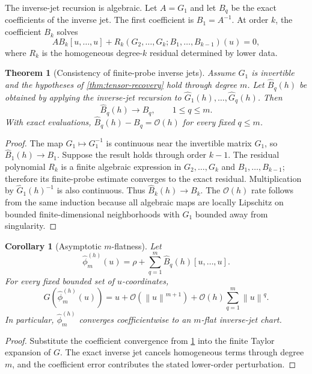\documentclass[11pt]{article}
\newtheorem{theorem}[definition]{Theorem}
\newtheorem{corollary}[definition]{Corollary}
\newcommand{\Oterm}{\mathcal O}
\newcommand{\norm}[1]{\left\lVert #1\right\rVert}
\begin{document}
The inverse-jet recursion is algebraic. Let \(A=G_1\) and let \(B_q\) be the exact coefficients of the inverse jet. The first coefficient is \(B_1=A^{-1}\). At order \(k\), the coefficient \(B_k\) solves
\[
        A B_k[u,\ldots,u]+R_k(G_2,\ldots,G_k;B_1,\ldots,B_{k-1})(u)=0,
\]
where \(R_k\) is the homogeneous degree-\(k\) residual determined by lower data.

\begin{theorem}[Consistency of finite-probe inverse jets]\label{thm:inverse-consistency}
Assume \(G_1\) is invertible and the hypotheses of \cref{thm:tensor-recovery} hold through degree \(m\). Let \(\widehat B_q(h)\) be obtained by applying the inverse-jet recursion to \(\widehat G_1(h),\ldots,\widehat G_q(h)\). Then
\[
        \widehat B_q(h)\to B_q,\qquad 1\le q\le m.
\]
With exact evaluations, \(\widehat B_q(h)-B_q=\Oterm(h)\) for every fixed \(q\le m\).
\end{theorem}

\begin{proof}
The map \(G_1\mapsto G_1^{-1}\) is continuous near the invertible matrix \(G_1\), so \(\widehat B_1(h)\to B_1\). Suppose the result holds through order \(k-1\). The residual polynomial \(R_k\) is a finite algebraic expression in \(G_2,\ldots,G_k\) and \(B_1,\ldots,B_{k-1}\); therefore its finite-probe estimate converges to the exact residual. Multiplication by \(\widehat G_1(h)^{-1}\) is also continuous. Thus \(\widehat B_k(h)\to B_k\). The \(\Oterm(h)\) rate follows from the same induction because all algebraic maps are locally Lipschitz on bounded finite-dimensional neighborhoods with \(G_1\) bounded away from singularity.
\end{proof}

\begin{corollary}[Asymptotic \(m\)-flatness]\label{cor:mflat}
Let
\[
        \widehat\phi_m^{(h)}(u)=\rho+\sum_{q=1}^m\widehat B_q(h)[u,\ldots,u].
\]
For every fixed bounded set of \(u\)-coordinates,
\[
        G(\widehat\phi_m^{(h)}(u))
        =
        u+\Oterm(\norm{u}^{m+1})+\Oterm(h)\sum_{q=1}^m\norm{u}^q.
\]
In particular, \(\widehat\phi_m^{(h)}\) converges coefficientwise to an \(m\)-flat inverse-jet chart.
\end{corollary}

\begin{proof}
Substitute the coefficient convergence from \cref{thm:inverse-consistency} into the finite Taylor expansion of \(G\). The exact inverse jet cancels homogeneous terms through degree \(m\), and the coefficient error contributes the stated lower-order perturbation.
\end{proof}
\end{document}
